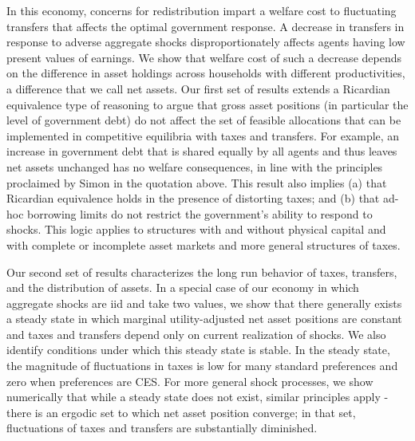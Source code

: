 \documentclass[thmsb,11pt]{article}
\begin{document}
In this economy, concerns for redistribution impart a welfare cost to fluctuating transfers that affects the optimal government response. A decrease in transfers in response to adverse aggregate shocks disproportionately affects agents having low present values of earnings. We show that welfare cost of such a decrease depends on the difference in asset holdings across households with different productivities, a difference that we call net assets. Our first set of results extends a Ricardian equivalence type of reasoning to argue that gross asset positions (in particular the level of government debt) do not affect the set of feasible allocations that can be implemented in competitive equilibria with taxes and transfers. For example, an increase in government debt that is shared equally by all agents and thus leaves net assets unchanged  has no welfare consequences, in line with the principles proclaimed by Simon \citet{newcomb1865critical} %
 in the quotation above. This result also implies (a) that Ricardian
equivalence holds in the presence of
distorting  taxes; and (b) that ad-hoc borrowing limits do not restrict the government's ability to respond to shocks.
This logic applies to structures with and without physical
capital and with complete or incomplete asset markets and more general structures of taxes.



Our second set of results characterizes the long run behavior of taxes, transfers, and the distribution of assets. In a special case of our economy in which aggregate shocks are iid and take two values, we show that  there generally exists a steady state in which marginal utility-adjusted net asset positions are constant and taxes and transfers depend only on current realization of shocks. We also identify conditions under which this steady state is stable. In the steady state, the magnitude of fluctuations in taxes is low for many standard preferences and zero when preferences are CES. For more general shock processes, we show numerically that while a steady state does not exist, similar principles apply - there is an ergodic set to which net asset position converge; in that set, fluctuations of taxes and transfers are substantially diminished.
\end{document}
